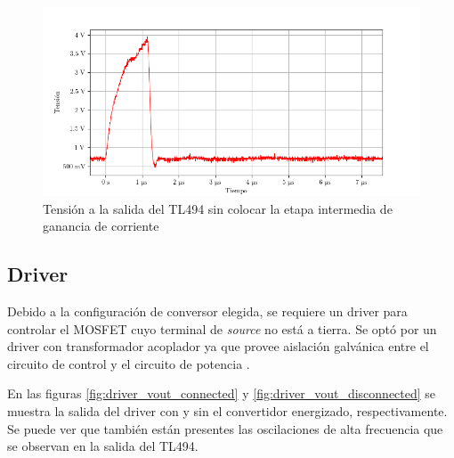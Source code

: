 \begin{figure}[H]
    \centering
    \includegraphics[width=\textwidth]{images/capturas-osciloscopio/TL494/pwm_vout_sin_bjt.png}
    \caption{Tensión a la salida del TL494 sin colocar la etapa intermedia de ganancia de corriente}
    \label{fig:pwm_vout_sin_bjt}
\end{figure}






\subsection{Driver}

Debido a la configuración de conversor elegida, se requiere un driver para controlar el MOSFET cuyo terminal de \textit{source} no está a tierra. Se optó por un driver con transformador acoplador ya que provee aislación galvánica entre el circuito de control y el circuito de potencia \cite{gatedrivers}.

En las figuras \ref{fig:driver_vout_connected} y \ref{fig:driver_vout_disconnected} se muestra la salida del driver con y sin el convertidor energizado, respectivamente.
Se puede ver que también están presentes las oscilaciones de alta frecuencia que se observan en la salida del TL494.


